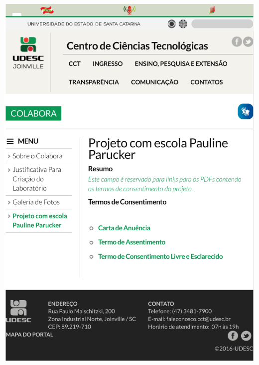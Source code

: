\begin{apendicesenv}
\hspace{-1.8cm}\includegraphics[scale=1.1]{./Termos/Colabora1.pdf}
\vspace{-10cm}

\end{apendicesenv}
